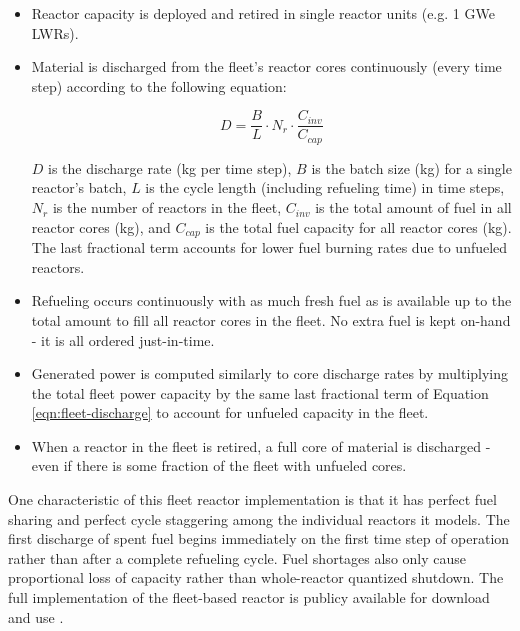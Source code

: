 \documentclass{style}
\begin{document}
\begin{itemize}

    \item Reactor capacity is deployed and retired in single reactor units
        (e.g. 1 GWe LWRs).

    \item Material is discharged from the fleet's reactor cores continuously
        (every time step) according to the following equation:

        \begin{equation}
            D =
            \frac{B}{L} \cdot N_{r} \cdot \frac{C_{inv}}{C_{cap}}
            \label{eqn:fleet-discharge}
        \end{equation}

        $D$ is the discharge rate (kg per time step), $B$ is the batch size
        (kg) for a single reactor's batch, $L$ is the cycle length (including
        refueling time) in time steps, $N_{r}$ is the number of reactors in
        the fleet, $C_{inv}$ is the total amount of fuel in all reactor cores
        (kg), and $C_{cap}$ is the total fuel capacity for all reactor cores
        (kg).  The last fractional term accounts for lower fuel burning rates
        due to unfueled reactors.

    \item Refueling occurs continuously with as much fresh fuel as is
        available up to the total amount to fill all reactor cores in the
        fleet.  No extra fuel is kept on-hand - it is all ordered
        just-in-time.

    \item Generated power is computed similarly to core discharge rates by
        multiplying the total fleet power capacity by the same last fractional
        term of Equation \ref{eqn:fleet-discharge} to account for unfueled
        capacity in the fleet.

    \item When a reactor in the fleet is retired, a full core of material is
        discharged - even if there is some fraction of the fleet with unfueled
        cores.
        
\end{itemize}

One characteristic of this fleet reactor implementation is that it has perfect
fuel sharing and perfect cycle staggering among the individual reactors it
models.  The first discharge of spent fuel begins immediately on
the first time step of operation rather than after a complete refueling cycle.
Fuel shortages also only cause proportional loss of capacity rather than
whole-reactor quantized shutdown.  The full implementation of the fleet-based
reactor is publicy available for download and use \cite{Carlsen2015}.
\end{document}
